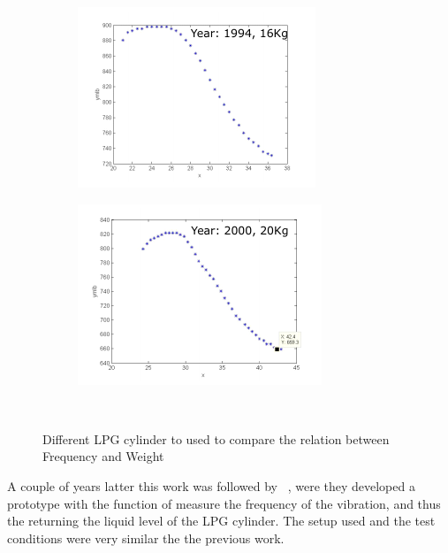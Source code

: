 \begin{figure}[]
\begin{subfigure}{0.45\textwidth}
        \centering
        \includegraphics[width=\linewidth]{Chapters/2CHP/Diagrams/g3line.pdf}
        \caption{}
        \label{subfig:g3lines}
    \end{subfigure}
    \begin{subfigure}{0.45\textwidth}
        \centering
        \includegraphics[width=\linewidth]{Chapters/2CHP/Diagrams/g4line.pdf}
        \caption{}
        \label{subfig:g4lines}
    \end{subfigure}
    \caption{Different LPG cylinder to used to compare the relation between Frequency and Weight}{~\cite{wuLiquidLevelDetector2014b}}
     \label{fig:noise}
 \end{figure}
A couple of years latter this work was followed by ~\citeauthor{wuAnalysisImplementationNoncontact2016a}, were they developed a prototype with the function of measure the frequency of the vibration, and thus the returning the liquid level of the LPG cylinder. The setup used and the test conditions were very similar the the previous work.


